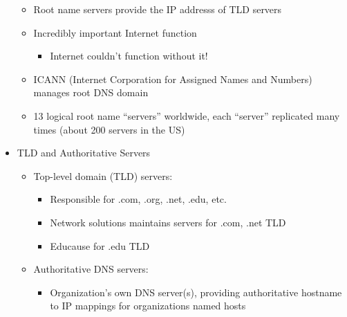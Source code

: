 \begin{itemize}
\begin{itemize}
      \item Root name servers provide the IP addresss of TLD servers

      \item Incredibly important Internet function

        \begin{itemize}

          \item Internet couldn't function without it!

        \end{itemize}

      \item ICANN (Internet Corporation for Assigned Names and Numbers) manages root DNS domain

      \item 13 logical root name ``servers'' worldwide, each ``server'' replicated many times (about 200 servers in the US)

    \end{itemize}

  \item TLD and Authoritative Servers

    \begin{itemize}

      \item Top-level domain (TLD) servers:

        \begin{itemize}

          \item Responsible for .com, .org, .net, .edu, etc.

          \item Network solutions maintains servers for .com, .net TLD

          \item Educause for .edu TLD

        \end{itemize}

      \item Authoritative DNS servers:

        \begin{itemize}

          \item Organization's own DNS server(s), providing authoritative hostname to IP mappings for organizations named hosts

        \end{itemize}


\end{itemize}
\end{itemize}
